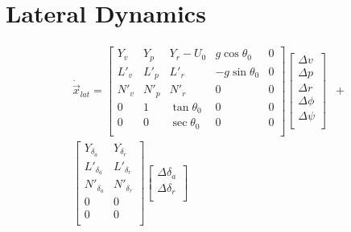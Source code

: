 \section{Lateral Dynamics}
\begin{align*}
    \dot{\vec{x}}_{lat} =
    \left[ \begin{array}{ *{5}{c} }
            Y_v  & Y_p  & Y_r - U_0     & g \cos \theta_0  & 0 \\
            L'_v & L'_p & L'_r          & -g \sin \theta_0 & 0 \\
            N'_v & N'_p & N'_r          & 0                & 0 \\
            0    & 1    & \tan \theta_0 & 0                & 0 \\
            0    & 0    & \sec \theta_0 & 0                & 0 \\
        \end{array} \right]
    \left[ \begin{array}{ *{1}{c} }
            \Delta v    \\
            \Delta p    \\
            \Delta r    \\
            \Delta \phi \\
            \Delta \psi \\
        \end{array} \right] & + \\
    \left[ \begin{array}{ *{5}{c} }
            Y_{\delta_{a}}  & Y_{\delta_{r}}  \\
            L'_{\delta_{a}} & L'_{\delta_{r}} \\
            N'_{\delta_{a}} & N'_{\delta_{r}} \\
            0               & 0               \\
            0               & 0               \\
        \end{array} \right]
    \left[ \begin{array}{ *{1}{c} }
            \Delta \delta_a \\
            \Delta \delta_r \\
        \end{array} \right] &   \\
\end{align*}
